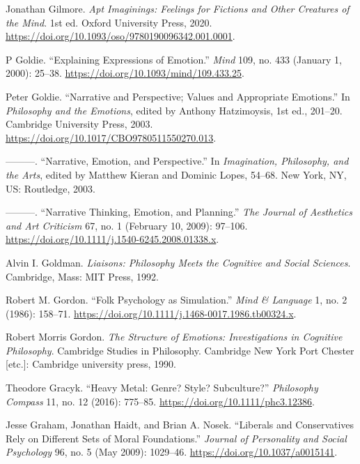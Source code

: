 \documentclass[phdthesis,12pt,final,a4paper]{wuthesis}
\newlength{\cslhangindent}
\newenvironment{CSLReferences}[2] %
{\begin{list}{}{%
	\setlength{\itemindent}{0pt}
	\setlength{\leftmargin}{0pt}
	\setlength{\parsep}{0pt}
	\ifodd #1
	\setlength{\leftmargin}{\cslhangindent}
	\setlength{\itemindent}{-1\cslhangindent}
	\fi
	\setlength{\itemsep}{#2\baselineskip}}}
{\end{list}}
\theoremstyle{definition}
\theoremstyle{definition}
\theoremstyle{definition}
\theoremstyle{definition}
\theoremstyle{remark}
\begin{document}
\begin{CSLReferences}{1}{0}
Jonathan Gilmore. \emph{Apt {Imaginings}: {Feelings} for {Fictions} and {Other Creatures} of the {Mind}}. 1st ed. Oxford University Press, 2020. \url{https://doi.org/10.1093/oso/9780190096342.001.0001}.

P Goldie. {``Explaining Expressions of Emotion.''} \emph{Mind} 109, no. 433 (January 1, 2000): 25--38. \url{https://doi.org/10.1093/mind/109.433.25}.

Peter Goldie. {``Narrative and {Perspective}; {Values} and {Appropriate Emotions}.''} In \emph{Philosophy and the {Emotions}}, edited by Anthony Hatzimoysis, 1st ed., 201--20. Cambridge University Press, 2003. \url{https://doi.org/10.1017/CBO9780511550270.013}.

---------. {``Narrative, Emotion, and Perspective.''} In \emph{Imagination, {Philosophy}, and the {Arts}}, edited by Matthew Kieran and Dominic Lopes, 54--68. New York, NY, US: Routledge, 2003.

---------. {``Narrative {Thinking}, {Emotion}, and {Planning}.''} \emph{The Journal of Aesthetics and Art Criticism} 67, no. 1 (February 10, 2009): 97--106. \url{https://doi.org/10.1111/j.1540-6245.2008.01338.x}.

Alvin I. Goldman. \emph{Liaisons: Philosophy Meets the Cognitive and Social Sciences}. Cambridge, Mass: MIT Press, 1992.

Robert M. Gordon. {``Folk Psychology as Simulation.''} \emph{Mind \& Language} 1, no. 2 (1986): 158--71. \url{https://doi.org/10.1111/j.1468-0017.1986.tb00324.x}.

Robert Morris Gordon. \emph{The Structure of Emotions: Investigations in Cognitive Philosophy}. Cambridge Studies in Philosophy. Cambridge New York Port Chester {[}etc.{]}: Cambridge university press, 1990.

Theodore Gracyk. {``Heavy Metal: Genre? {Style}? {Subculture}?''} \emph{Philosophy Compass} 11, no. 12 (2016): 775--85. \url{https://doi.org/10.1111/phc3.12386}.

Jesse Graham, Jonathan Haidt, and Brian A. Nosek. {``Liberals and Conservatives Rely on Different Sets of Moral Foundations.''} \emph{Journal of Personality and Social Psychology} 96, no. 5 (May 2009): 1029--46. \url{https://doi.org/10.1037/a0015141}.


\end{CSLReferences}
\end{document}
